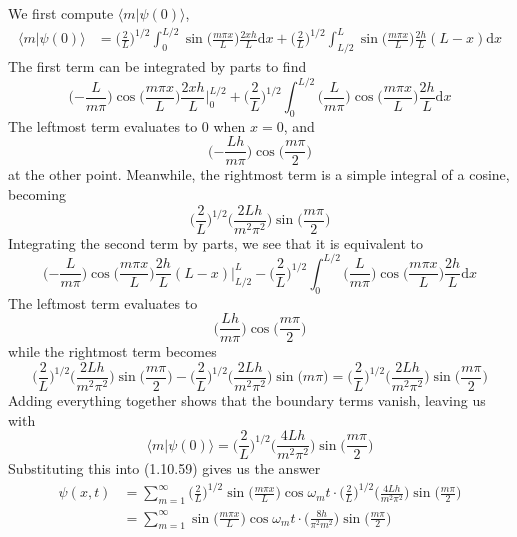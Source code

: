 \documentclass[../principles-of-quantum-mechanics.tex]{subfiles}
\begin{document}
\begin{questions}
\begin{solution}
	We first compute $\langle m|\psi(0)\rangle$,
	\begin{align*}
		\langle m|\psi(0)\rangle &= \Big(\frac{2}{L}\Big)^{1/2}\int_0^{L/2}\sin\Big(\frac{m\pi{x}}{L}\Big)\frac{2xh}{L}\mathrm{d}x + \Big(\frac{2}{L}\Big)^{1/2}\int_{L/2}^{L}\sin\Big(\frac{m\pi{x}}{L}\Big)\frac{2h}{L}(L-x)\mathrm{d}x
	\end{align*}
	The first term can be integrated by parts to find
	\[
	\Big({-\frac{L}{m\pi}}\Big)\cos\Big(\frac{m\pi{x}}{L}\Big)\frac{2xh}{L}\Big|_{0}^{L/2} +  \Big(\frac{2}{L}\Big)^{1/2}\int_0^{L/2}\Big({\frac{L}{m\pi}}\Big)\cos\Big(\frac{m\pi{x}}{L}\Big)\frac{2h}{L}\mathrm{d}x
	\]
	The leftmost term evaluates to $0$ when $x = 0$, and
	\[
		\Big({-\frac{Lh}{m\pi}}\Big)\cos\Big(\frac{m\pi}{2}\Big)
	\]
	at the other point. Meanwhile, the rightmost term is a simple integral of a cosine, becoming
	\[
		\Big(\frac{2}{L}\Big)^{1/2}\Big(\frac{2Lh}{m^2\pi^2}\Big)\sin\Big(\frac{m\pi}{2}\Big)
	\]
	Integrating the second term by parts, we see that it is equivalent to
	\[
	\Big({-\frac{L}{m\pi}}\Big)\cos\Big(\frac{m\pi{x}}{L}\Big)\frac{2h}{L}(L-x)\Big|_{L/2}^{L} -  \Big(\frac{2}{L}\Big)^{1/2}\int_0^{L/2}\Big({\frac{L}{m\pi}}\Big)\cos\Big(\frac{m\pi{x}}{L}\Big)\frac{2h}{L}\mathrm{d}x
	\]
	The leftmost term evaluates to
	\[
		\Big({\frac{Lh}{m\pi}}\Big)\cos\Big(\frac{m\pi}{2}\Big)
	\]
	while the rightmost term becomes
	\[
		\Big(\frac{2}{L}\Big)^{1/2}\Big(\frac{2Lh}{m^2\pi^2}\Big)\sin\Big(\frac{m\pi}{2}\Big) - \Big(\frac{2}{L}\Big)^{1/2}\Big(\frac{2Lh}{m^2\pi^2}\Big)\sin\Big(m\pi\Big) = \Big(\frac{2}{L}\Big)^{1/2}\Big(\frac{2Lh}{m^2\pi^2}\Big)\sin\Big(\frac{m\pi}{2}\Big)
	\]
	Adding everything together shows that the boundary terms vanish, leaving us with
	\[
		\langle{m}|\psi(0)\rangle = \Big(\frac{2}{L}\Big)^{1/2}\Big(\frac{4Lh}{m^2\pi^2}\Big)\sin\Big(\frac{m\pi}{2}\Big)
	\]
	Substituting this into (1.10.59) gives us the answer
	\begin{align*}
		\psi(x, t) &= \sum_{m=1}^{\infty}\Big(\frac{2}{L}\Big)^{1/2}\sin\Big(\frac{m\pi{x}}{L}\Big)\cos \omega_mt\cdot\Big(\frac{2}{L}\Big)^{1/2}\Big(\frac{4Lh}{m^2\pi^2}\Big)\sin\Big(\frac{m\pi}{2}\Big) \\
		&= \sum_{m=1}^{\infty}\sin\Big(\frac{m\pi{x}}{L}\Big)\cos\omega_mt\cdot\Big(\frac{8h}{\pi^2m^2}\Big)\sin\Big(\frac{m\pi}{2}\Big)
	\end{align*}
\end{solution}

\end{questions}
\end{document}
